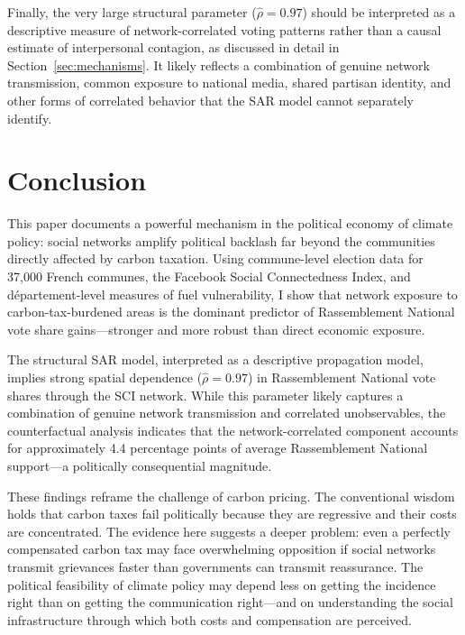 \documentclass[12pt]{article}
\newcommand{\rn}{Rassemblement National}
\newcommand{\dept}{d\'{e}partement}
\begin{document}
Finally, the very large structural parameter ($\hat{\rho} = 0.97$) should be interpreted as a descriptive measure of network-correlated voting patterns rather than a causal estimate of interpersonal contagion, as discussed in detail in Section~\ref{sec:mechanisms}. It likely reflects a combination of genuine network transmission, common exposure to national media, shared partisan identity, and other forms of correlated behavior that the SAR model cannot separately identify.



\section{Conclusion}
\label{sec:conclusion}

This paper documents a powerful mechanism in the political economy of climate policy: social networks amplify political backlash far beyond the communities directly affected by carbon taxation. Using commune-level election data for 37,000 French communes, the Facebook Social Connectedness Index, and \dept{}-level measures of fuel vulnerability, I show that network exposure to carbon-tax-burdened areas is the dominant predictor of \rn{} vote share gains---stronger and more robust than direct economic exposure.

The structural SAR model, interpreted as a descriptive propagation model, implies strong spatial dependence ($\hat{\rho} = 0.97$) in \rn{} vote shares through the SCI network. While this parameter likely captures a combination of genuine network transmission and correlated unobservables, the counterfactual analysis indicates that the network-correlated component accounts for approximately 4.4 percentage points of average \rn{} support---a politically consequential magnitude.

These findings reframe the challenge of carbon pricing. The conventional wisdom holds that carbon taxes fail politically because they are regressive and their costs are concentrated. The evidence here suggests a deeper problem: even a perfectly compensated carbon tax may face overwhelming opposition if social networks transmit grievances faster than governments can transmit reassurance. The political feasibility of climate policy may depend less on getting the incidence right than on getting the communication right---and on understanding the social infrastructure through which both costs and compensation are perceived.
\end{document}
